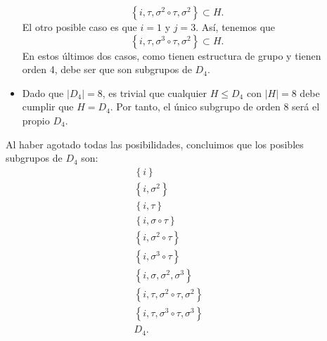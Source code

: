 \documentclass{article}
\begin{document}
\begin{sol}
\begin{description}
\begin{itemize}
\[ \left\{ i, \tau, \sigma^{2}\circ\tau, \sigma^{2}\right\} \subset H .\]
El otro posible caso es que $\displaystyle i = 1 $ y $\displaystyle j = 3 $. Así, tenemos que 
\[ \left\{ i, \tau, \sigma^{3}\circ\tau, \sigma^{2}\right\} \subset H .\]
En estos últimos dos casos, como tienen estructura de grupo y tienen orden 4, debe ser que son subgrupos de $\displaystyle D_{4} $.
		\item Dado que $\displaystyle \left|D_{4}\right| = 8 $, es trivial que cualquier $\displaystyle H \leq D_{4} $ con $\displaystyle \left|H\right| = 8 $ debe cumplir que $\displaystyle H = D_{4} $. Por tanto, el único subgrupo de orden 8 será el propio $\displaystyle D_{4} $.
	\end{itemize}
Al haber agotado todas las posibilidades, concluimos que los posibles subgrupos de $\displaystyle D_{4} $ son:
\[
\begin{split}
	\left\{ i\right\}  \\
	\left\{ i, \sigma^{2}\right\} \\
	\left\{ i, \tau\right\} \\
	\left\{ i, \sigma\circ\tau\right\} \\
	\left\{ i, \sigma^{2}\circ\tau\right\} \\
	\left\{ i, \sigma^{3}\circ\tau\right\} \\
	\left\{ i, \sigma, \sigma^{2}, \sigma^{3}\right\} \\
	\left\{ i, \tau, \sigma^{2}\circ\tau, \sigma^{2}\right\} \\
	\left\{ i, \tau, \sigma^{3}\circ\tau, \sigma^{3}\right\} \\
	D_{4}.
\end{split}
\]
\end{description}
\end{sol}
\end{document}
